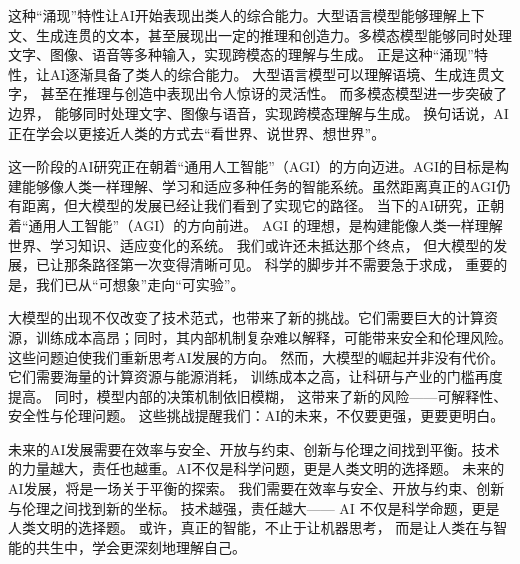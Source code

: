 这种“涌现”特性让AI开始表现出类人的综合能力。大型语言模型能够理解上下文、生成连贯的文本，甚至展现出一定的推理和创造力。多模态模型能够同时处理文字、图像、语音等多种输入，实现跨模态的理解与生成。
正是这种“涌现”特性，让AI逐渐具备了类人的综合能力。  
大型语言模型可以理解语境、生成连贯文字，  
甚至在推理与创造中表现出令人惊讶的灵活性。  
而多模态模型进一步突破了边界，  
能够同时处理文字、图像与语音，实现跨模态理解与生成。  
换句话说，AI正在学会以更接近人类的方式去“看世界、说世界、想世界”。  

这一阶段的AI研究正在朝着“通用人工智能”（AGI）的方向迈进。AGI的目标是构建能够像人类一样理解、学习和适应多种任务的智能系统。虽然距离真正的AGI仍有距离，但大模型的发展已经让我们看到了实现它的路径。
当下的AI研究，正朝着“通用人工智能”（AGI）的方向前进。  
AGI 的理想，是构建能像人类一样理解世界、学习知识、适应变化的系统。  
我们或许还未抵达那个终点，  
但大模型的发展，已让那条路径第一次变得清晰可见。  
科学的脚步并不需要急于求成，  
重要的是，我们已从“可想象”走向“可实验”。  

大模型的出现不仅改变了技术范式，也带来了新的挑战。它们需要巨大的计算资源，训练成本高昂；同时，其内部机制复杂难以解释，可能带来安全和伦理风险。这些问题迫使我们重新思考AI发展的方向。
然而，大模型的崛起并非没有代价。  
它们需要海量的计算资源与能源消耗，  
训练成本之高，让科研与产业的门槛再度提高。  
同时，模型内部的决策机制依旧模糊，  
这带来了新的风险——可解释性、安全性与伦理问题。  
这些挑战提醒我们：AI的未来，不仅要更强，更要更明白。  

未来的AI发展需要在效率与安全、开放与约束、创新与伦理之间找到平衡。技术的力量越大，责任也越重。AI不仅是科学问题，更是人类文明的选择题。
未来的AI发展，将是一场关于平衡的探索。  
我们需要在效率与安全、开放与约束、创新与伦理之间找到新的坐标。  
技术越强，责任越大——  
AI 不仅是科学命题，更是人类文明的选择题。  
或许，真正的智能，不止于让机器思考，  
而是让人类在与智能的共生中，学会更深刻地理解自己。  